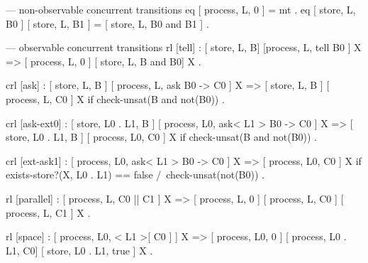 \begin{maude}
--- non-observable concurrent transitions
  eq [ process, L, 0 ]
   = mt .
  eq [ store, L, B0 ] [ store, L, B1 ]
   = [ store, L, B0 and B1 ] .

  --- observable concurrent transitions
  rl [tell] :
     { [ store, L, B] [process, L, tell B0 ] X }
  => { [ process, L, 0 ] [ store, L, B and B0] X } .

 crl [ask] :
     { [ store, L, B ] [ process, L, ask B0  -> C0 ] X }
  => { [ store, L, B ] [ process, L, C0 ] X }
  if check-unsat(B and not(B0)) .

 crl [ask-ext0] :
     { [ store, L0 . L1, B ] [ process, L0, ask< L1 > B0  -> C0 ] X }
  => { [ store, L0 . L1, B ] [ process, L0, C0 ] X }
  if check-unsat(B and not(B0)) . 

 crl [ext-ask1] :
     { [ process, L0, ask< L1 > B0  -> C0 ] X }
  => { [ process, L0, C0 ] X }
  if exists-store?(X, L0 . L1) == false
  /\ check-unsat(not(B0)) . 

  rl [parallel] :
     { [ process, L, C0 || C1 ] X }
  => { [ process, L, 0 ] [ process, L, C0 ] [ process, L, C1 ] X } .

  rl [space] :
     { [ process, L0, < L1 >[ C0 ] ] X } 
  => { [ process, L0, 0 ] [ process, L0 . L1, C0] [ store, L0 . L1, true ] X } .
\end{maude}

